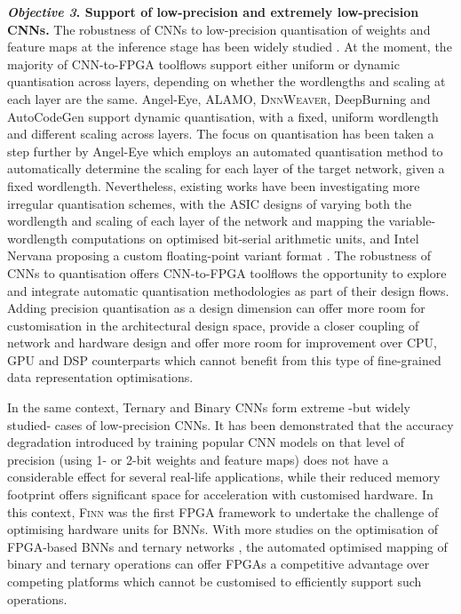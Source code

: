 \documentclass[format=acmsmall, review=false, screen=true]{acmart}
\begin{document}
\textbf{\textit{Objective 3}. Support of low-precision and extremely low-precision CNNs.}
The robustness of CNNs to low-precision quantisation of weights and feature maps at the inference stage has been widely studied \cite{Holi_1993}\cite{Gupta_2015}\cite{Gysel_2016}\cite{Hashemi_2017}\cite{Zhou_17}. At the moment, the majority of CNN-to-FPGA toolflows support either uniform or {\color{black}dynamic} quantisation across layers, depending on whether the wordlengths {\color{black}and scaling} at each layer are the same. Angel-Eye, ALAMO, \textsc{DnnWeaver}, DeepBurning and AutoCodeGen support dynamic quantisation, {\color{black}with a fixed, uniform wordlength and different scaling across layers}. The focus on quantisation has been taken a step further by Angel-Eye which employs {\color{black}an automated quantisation method to automatically determine the scaling for each layer of the target network, given a fixed wordlength}. {\color{black}Nevertheless, existing works have been investigating more irregular quantisation schemes, with the ASIC designs of \cite{Judd2016stripes}\cite{Albericio2017pragmatic} 
varying both the wordlength and scaling of each layer of the network and mapping the variable-wordlength computations on optimised bit-serial arithmetic units, and Intel Nervana proposing a custom floating-point variant format \cite{flexpoint2017nips}.} The robustness of CNNs to quantisation offers CNN-to-FPGA toolflows the opportunity to explore and integrate automatic quantisation methodologies as part of their design flows. Adding precision quantisation as a design dimension can offer more room for customisation in the architectural design space, provide a closer coupling of network and hardware design and offer more room for improvement over CPU, GPU and DSP counterparts which cannot benefit from this type of fine-grained data representation optimisations.


In the same context, Ternary \cite{zhu2016trained}\cite{Alemdar2017ijcnn} and Binary \cite{NIPS2016_bnns}\cite{rastegariECCV16} CNNs form extreme -but widely studied- cases of low-precision CNNs. It has been demonstrated that the accuracy degradation introduced by training popular CNN models on that level of precision (using 1- or 2-bit weights and feature maps) does not have a considerable effect for several real-life applications, while their reduced memory footprint offers significant space for acceleration with customised hardware. In this context, \textsc{Finn} was the first FPGA framework to undertake the challenge of optimising hardware units for BNNs. With more studies on the optimisation of FPGA-based BNNs \cite{Zhao_2017}\cite{Liang2018fpbnn} and ternary networks \cite{Boucle2017fpl}, the automated optimised mapping of binary and ternary operations can offer FPGAs a competitive advantage over competing platforms which cannot be customised to efficiently support such operations. 
\end{document}
